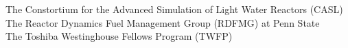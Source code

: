
The Constortium for the Advanced Simulation of Light Water Reactors (CASL) \\
The Reactor Dynamics Fuel Management Group (RDFMG) at Penn State \\
The Toshiba Westinghouse Fellows Program (TWFP) \\

